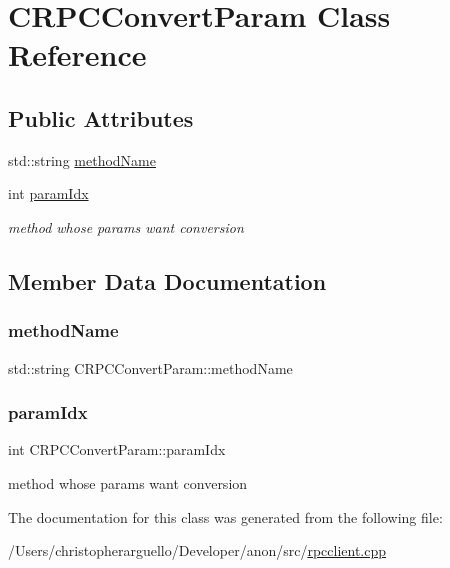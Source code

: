\hypertarget{class_c_r_p_c_convert_param}{}\section{C\+R\+P\+C\+Convert\+Param Class Reference}
\label{class_c_r_p_c_convert_param}
\subsection*{Public Attributes}
\begin{DoxyCompactItemize}
\item 
std\+::string \mbox{\hyperlink{class_c_r_p_c_convert_param_a072d6cde94ea57223445dee927ee1527}{method\+Name}}
\item 
int \mbox{\hyperlink{class_c_r_p_c_convert_param_a3bd464f8d5db060616e7be8fbacb58f8}{param\+Idx}}
\begin{DoxyCompactList}\small\item\em method whose params want conversion \end{DoxyCompactList}\end{DoxyCompactItemize}


\subsection{Member Data Documentation}
\mbox{\label{class_c_r_p_c_convert_param_a072d6cde94ea57223445dee927ee1527}} 
\subsubsection{\texorpdfstring{method\+Name}{methodName}}
{\footnotesize\ttfamily std\+::string C\+R\+P\+C\+Convert\+Param\+::method\+Name}

\mbox{\label{class_c_r_p_c_convert_param_a3bd464f8d5db060616e7be8fbacb58f8}} 
\subsubsection{\texorpdfstring{param\+Idx}{paramIdx}}
{\footnotesize\ttfamily int C\+R\+P\+C\+Convert\+Param\+::param\+Idx}



method whose params want conversion 



The documentation for this class was generated from the following file\+:\begin{DoxyCompactItemize}
\item 
/\+Users/christopherarguello/\+Developer/anon/src/\mbox{\hyperlink{rpcclient_8cpp}{rpcclient.\+cpp}}\end{DoxyCompactItemize}
